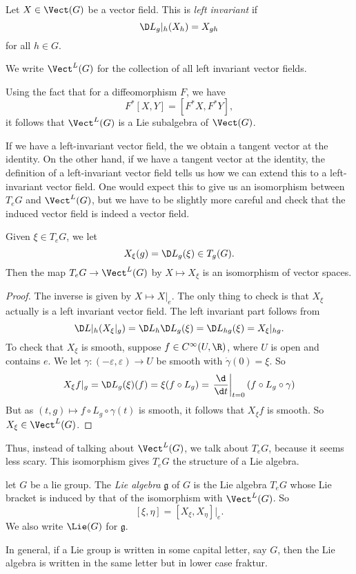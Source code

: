 \documentclass[a4paper]{article}
\begin{document}
\begin{defi}
  Let $X \in \Vect(G)$ be a vector field. This is \emph{left invariant} if
  \[
    \D L_g|_h (X_h) = X_{gh}
  \]
  for all $h \in G$.

  We write $\Vect^L(G)$ for the collection of all left invariant vector fields.
\end{defi}

Using the fact that for a diffeomorphism $F$, we have
\[
  F^*[X, Y] = [F^* X, F^* Y],
\]
it follows that $\Vect^L(G)$ is a Lie subalgebra of $\Vect(G)$.

If we have a left-invariant vector field, the we obtain a tangent vector at the identity. On the other hand, if we have a tangent vector at the identity, the definition of a left-invariant vector field tells us how we can extend this to a left-invariant vector field. One would expect this to give us an isomorphism between $T_e G$ and $\Vect^L(G)$, but we have to be slightly more careful and check that the induced vector field is indeed a vector field.

\begin{lemma}
  Given $\xi \in T_e G$, we let
  \[
    X_\xi(g) = \D L_g(\xi) \in T_g(G).
  \]
  Then the map $T_e G \to \Vect^L(G)$ by $X \mapsto X_\xi$ is an isomorphism of vector spaces.
\end{lemma}

\begin{proof}
  The inverse is given by $X \mapsto X|_e$. The only thing to check is that $X_\xi$ actually is a left invariant vector field. The left invariant part follows from
  \[
    \D L|_h (X_\xi|_g) = \D L_h \D L_g (\xi) = \D L_{hg}(\xi) = X_\xi |_{hg}.
  \]
  To check that $X_\xi$ is smooth, suppose $f \in C^\infty(U, \R)$, where $U$ is open and contains $e$. We let $\gamma: (-\varepsilon, \varepsilon) \to U$ be smooth with $\dot{\gamma}(0) = \xi$. So
  \[
    X_\xi f|_g = \D L_g (\xi)(f) = \xi(f \circ L_g) = \left.\frac{\d}{\d t}\right|_{t = 0} (f \circ L_g \circ \gamma)
  \]
  But as $(t, g) \mapsto f \circ L_g \circ \gamma(t)$ is smooth, it follows that $X_\xi f$ is smooth. So $X_\xi \in \Vect^L(G)$.
\end{proof}

Thus, instead of talking about $\Vect^L(G)$, we talk about $T_e G$, because it seems less scary. This isomorphism gives $T_eG$ the structure of a Lie algebra.

\begin{defi}
  let $G$ be a lie group. The \emph{Lie algebra} $\mathfrak{g}$ of $G$ is the Lie algebra $T_eG$ whose Lie bracket is induced by that of the isomorphism with $\Vect^L(G)$. So
  \[
    [\xi, \eta] = [X_\xi, X_\eta]|_e.
  \]
  We also write $\Lie(G)$ for $\mathfrak{g}$.
\end{defi}
In general, if a Lie group is written in some capital letter, say $G$, then the Lie algebra is written in the same letter but in lower case fraktur.
\end{document}
